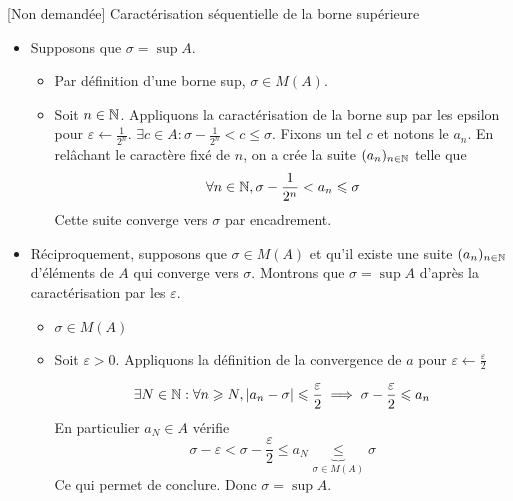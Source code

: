 \documentclass{article}
\begin{document}
\begin{question_kholle}[{Soit $A \in \mathcal{P}(\R)$ non vide et majorée. Soit $\sigma \in \R$
				$$
					\sigma = \sup A \iff \left\{ \begin{array}{ll}
						\sigma \in M(A) \\
						\exists (a_{n})_{n \in \N} \in A^{\N} : \lim_{n \to +\infty} a_n = \sigma
					\end{array}\right.
				$$
			}]{[Non demandée] Caractérisation séquentielle de la borne supérieure}
	\begin{itemize}[label=$\star$]
		\item Supposons que $\sigma = \sup A$.
		      \begin{itemize}[label=$\bullet$]
			      \item Par définition d'une borne sup, $\sigma \in M(A)$.
			      \item Soit $n \in \mathbb N$. Appliquons la caractérisation de la borne sup par les epsilon pour $\varepsilon \leftarrow \frac{1}{2^{n}}$.
			            $\exists c \in A : \sigma - \frac{1}{2^{n}} < c \leqslant \sigma$.
			            Fixons un tel $c$ et notons le $a_{n}$. En relâchant le caractère fixé de $n$, on a crée la suite $(a_{n})_{n \in \mathbb N}$ telle que
			            $$
				            \forall n \in \mathbb N, \sigma - \frac{1}{2^{n}} < a_{n}\leqslant \sigma
			            $$
			            Cette suite converge vers $\sigma$ par encadrement.
		      \end{itemize}
		\item Réciproquement, supposons que $\sigma \in M(A)$ et qu'il existe une suite $(a_{n})_{n \in \mathbb N}$ d'éléments de $A$ qui converge vers $\sigma$. Montrons que $\sigma = \sup A$ d'après la caractérisation par les $\varepsilon$.
		      \begin{itemize}[label=$\bullet$]
			      \item$\sigma \in M(A)$
			      \item Soit $\varepsilon>0$. Appliquons la définition de la convergence de $a$ pour $\varepsilon \leftarrow \frac{\varepsilon}{2}$

			            $$
				            \exists N \in \mathbb N : \forall n \geqslant N, \lvert a_{n} - \sigma \rvert  \leqslant \frac{\varepsilon}{2} \implies \sigma - \frac{\varepsilon}{2}\leqslant a_{n}
			            $$
			            En particulier $a_{N} \in A$ vérifie
			            $$
				            \sigma - \varepsilon < \sigma - \frac{\varepsilon}{2} \leqslant a_{N} \underbrace{ \leqslant }_{ \sigma \in M(A) } \sigma
			            $$
			            Ce qui permet de conclure.
			            Donc $\sigma = \sup A$.
		      \end{itemize}
	\end{itemize}
\end{question_kholle}
\end{document}
